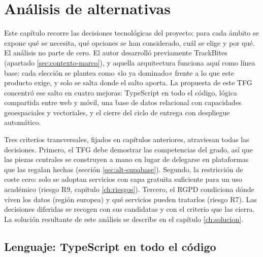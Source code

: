 
\chapter{Análisis de alternativas}
\label{ch:alternativas}

Este capítulo recorre las decisiones tecnológicas del proyecto: para cada ámbito se expone qué se necesita, qué opciones se han considerado, cuál se elige y por qué.
El análisis no parte de cero.
El autor desarrolló previamente TrackBites \parencite{deleanu-trackbites} (apartado \ref{sec:contexto-marco}), y aquella arquitectura funciona aquí como línea base: cada elección se plantea como «lo ya dominado» frente a lo que este producto exige, y solo se salta donde el salto aporta.
La propuesta de este \ac{TFG} concentró ese salto en cuatro mejoras: TypeScript en todo el código, lógica compartida entre web y móvil, una base de datos relacional con capacidades geoespaciales y vectoriales, y el cierre del ciclo de entrega con despliegue automático.

Tres criterios transversales, fijados en capítulos anteriores, atraviesan todas las decisiones.
Primero, el \ac{TFG} debe demostrar las competencias del grado, así que las piezas centrales se construyen a mano en lugar de delegarse en plataformas que las regalan hechas (sección \ref{sec:alt-supabase}).
Segundo, la restricción de coste cero: solo se adoptan servicios con capa gratuita suficiente para un uso académico (riesgo R9, capítulo \ref{ch:riesgos}).
Tercero, el \ac{RGPD} condiciona dónde viven los datos (región europea) y qué servicios pueden tratarlos (riesgo R7).
Las decisiones diferidas se recogen con sus candidatas y con el criterio que las cierra.
La solución resultante de este análisis se describe en el capítulo \ref{ch:solucion}.

\section{Lenguaje: TypeScript en todo el código}
\label{sec:alt-lenguaje}

